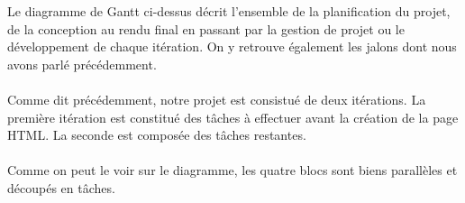 Le diagramme de Gantt ci-dessus décrit l’ensemble de la planification du projet, de la conception au rendu final en passant par la gestion de projet ou le développement de chaque itération. On y retrouve également les jalons dont nous avons parlé précédemment.

\paragraph{}
Comme dit précédemment, notre projet est consistué de deux itérations. La première itération est constitué des tâches à effectuer avant la création de la page HTML. La seconde est composée des tâches restantes.

\paragraph{}
Comme on peut le voir sur le diagramme, les quatre blocs sont biens parallèles et découpés en tâches.

















